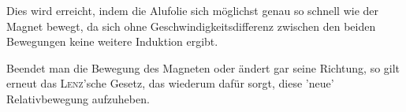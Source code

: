 Dies wird erreicht, indem die Alufolie sich möglichst genau so schnell wie der Magnet bewegt, da sich ohne Geschwindigkeitsdifferenz zwischen den beiden Bewegungen keine weitere Induktion ergibt.

Beendet man die Bewegung des Magneten oder ändert gar seine Richtung, so gilt erneut das \textsc{Lenz}'sche Gesetz, das wiederum dafür sorgt, diese 'neue' Relativbewegung aufzuheben.





%
%
%
%
%


